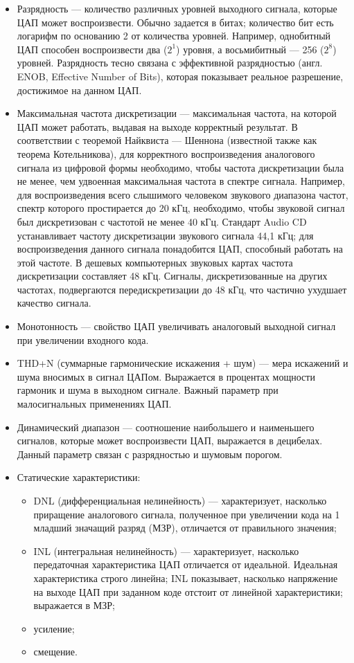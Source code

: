 \documentclass[unicode, 12pt, a4paper, oneside]{article}
\begin{document}
\begin{itemize}
\item Разрядность — количество различных уровней выходного сигнала, которые ЦАП может воспроизвести. Обычно задается в битах; количество бит есть логарифм по основанию 2 от количества уровней. Например, однобитный ЦАП способен воспроизвести два ($2^1$) уровня, а восьмибитный — 256 ($2^8$) уровней. Разрядность тесно связана с эффективной разрядностью (англ. ENOB, Effective Number of Bits), которая показывает реальное разрешение, достижимое на данном ЦАП.

\item Максимальная частота дискретизации — максимальная частота, на которой ЦАП может работать, выдавая на выходе корректный результат. В соответствии с теоремой Найквиста — Шеннона (известной также как теорема Котельникова), для корректного воспроизведения аналогового сигнала из цифровой формы необходимо, чтобы частота дискретизации была не менее, чем удвоенная максимальная частота в спектре сигнала. Например, для воспроизведения всего слышимого человеком звукового диапазона частот, спектр которого простирается до 20 кГц, необходимо, чтобы звуковой сигнал был дискретизован с частотой не менее 40 кГц. Стандарт Audio CD устанавливает частоту дискретизации звукового сигнала 44,1 кГц; для воспроизведения данного сигнала понадобится ЦАП, способный работать на этой частоте. В дешевых компьютерных звуковых картах частота дискретизации составляет 48 кГц. Сигналы, дискретизованные на других частотах, подвергаются передискретизации до 48 кГц, что частично ухудшает качество сигнала.

\item Монотонность — свойство ЦАП увеличивать аналоговый выходной сигнал при увеличении входного кода.

\item THD+N (суммарные гармонические искажения + шум) — мера искажений и шума вносимых в сигнал ЦАПом. Выражается в процентах мощности гармоник и шума в выходном сигнале. Важный параметр при малосигнальных применениях ЦАП.

\item Динамический диапазон — соотношение наибольшего и наименьшего сигналов, которые может воспроизвести ЦАП, выражается в децибелах. Данный параметр связан с разрядностью и шумовым порогом.

\item Статические характеристики:
	\begin{itemize}
	\item DNL (дифференциальная нелинейность) — характеризует, насколько приращение аналогового сигнала, полученное при увеличении кода на 1 младший значащий разряд (МЗР), отличается от правильного значения;
	\item INL (интегральная нелинейность) — характеризует, насколько передаточная характеристика ЦАП отличается от идеальной. Идеальная характеристика строго линейна; INL показывает, насколько напряжение на выходе ЦАП при заданном коде отстоит от линейной характеристики; выражается в МЗР;
	\item усиление;
	\item смещение.
	\end{itemize}


\end{itemize}
\end{document}
